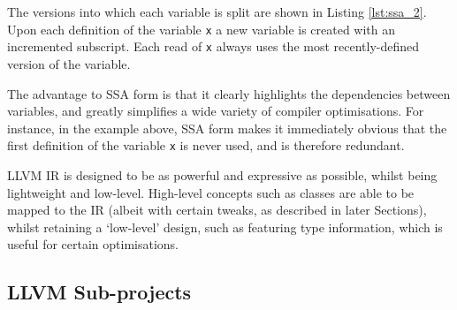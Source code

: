 The versions into which each variable is split are shown in Listing \ref{lst:ssa_2}. Upon each definition of the variable \verb|x| a new variable is created with an incremented subscript. Each read of \verb|x| always uses the most recently-defined version of the variable.

The advantage to SSA form is that it clearly highlights the dependencies between variables, and greatly simplifies a wide variety of compiler optimisations. For instance, in the example above, SSA form makes it immediately obvious that the first definition of the variable \verb|x| is never used, and is therefore redundant.

LLVM IR is designed to be as powerful and expressive as possible, whilst being lightweight and low-level. High-level concepts such as classes are able to be mapped to the IR (albeit with certain tweaks, as described in later Sections), whilst retaining a `low-level' design, such as featuring type information, which is useful for certain optimisations.

\subsection*{LLVM Sub-projects}


